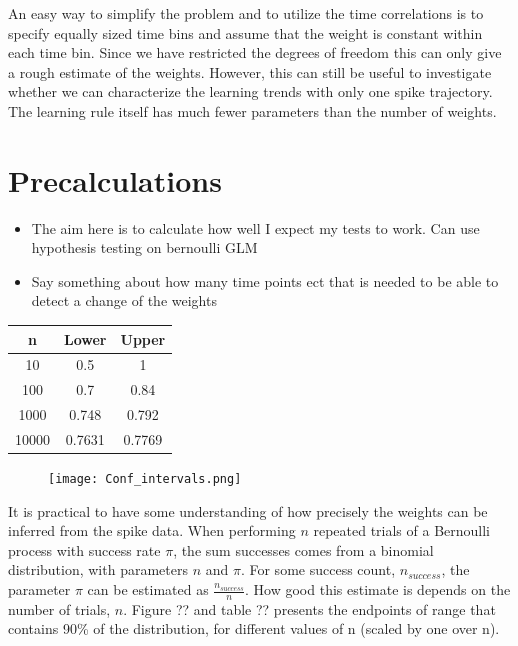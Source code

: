 An easy way to simplify the problem and to utilize the time correlations is to specify equally sized time bins and assume that the weight is constant within each time bin. Since we have restricted the degrees of freedom this can only give a rough estimate of the weights. However, this can still be useful to investigate whether we can characterize the learning trends with only one spike trajectory. The learning rule itself has much fewer parameters than the number of weights. 



\section{Precalculations}
\label{Precalc}

\begin{itemize}
    \item The aim here is to calculate how well I expect my tests to work. Can use hypothesis testing on bernoulli GLM 
    \item Say something about how many time points ect that is needed to be able to detect a change of the weights
\end{itemize}

\begin{table}
\begin{center}
 \begin{tabular}{||c c c ||} 
 \hline
 n & Lower & Upper \\ [0.5ex] 
 \hline\hline
 10 & 0.5 & 1 \\ 
 \hline
 100 & 0.7 & 0.84 \\
 \hline
 1000 & 0.748 & 0.792 \\
 \hline
 10000 & 0.7631 & 0.7769 \\ [1ex] 
 \hline
\end{tabular}
\end{center}
\end{table}

\begin{figure}[h]
    \centering
    \texttt{[image: Conf\_intervals.png]}
\end{figure}

It is practical to have some understanding of how precisely the weights can be inferred from the spike data. When performing $n$ repeated trials of a Bernoulli process with success rate $\pi$, the sum successes comes from a binomial distribution, with parameters $n$ and $\pi$. For some success count, $n_{success}$, the parameter $\pi$ can be estimated as $\frac{n_{success}}{n}$. How good this estimate is depends on the number of trials, $n$. Figure ?? and table ?? presents the endpoints of range that contains 90\% of the distribution, for different values of n (scaled by one over n). 